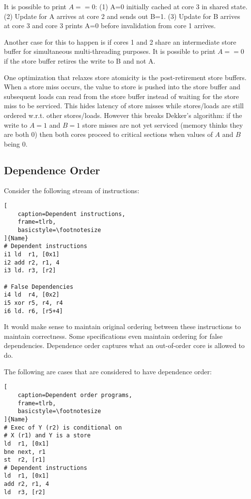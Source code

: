 \documentclass{article}
\begin{document}
\begin{multicols*}{2}
\noindent\newline
It is possible to print $A == 0$: (1) A=0 initially cached at core 3 in shared state. (2) Update for A arrives at core 2 and sends out B=1. (3) Update for B arrives at core 3 and core 3 prints A=0 before invalidation from core 1 arrives.
\medskip\par\noindent
Another case for this to happen is if cores 1 and 2 share an intermediate store buffer for simultaneous multi-threading purposes. It is possible to print $A==0$ if the store buffer retires the write to B and not A.
\medskip\par\noindent
One optimization that relaxes store atomicity is the post-retirement store buffers. When a store miss occurs, the value to store is pushed into the store buffer and subsequent loads can read from the store buffer instead of waiting for the store miss to be serviced. This hides latency of store misses while stores/loads are still ordered w.r.t. other stores/loads. However this breaks Dekker's algorithm: if the write to $A=1$ and $B=1$ store misses are not yet serviced (memory thinks they are both 0) then both cores proceed to critical sections when values of $A$ and $B$ being 0.

\subsection{Dependence Order}
Consider the following stream of instructions:
\begin{lstlisting}[
    caption=Dependent instructions,
    frame=tlrb,
    basicstyle=\footnotesize
]{Name}
# Dependent instructions
i1 ld  r1, [0x1]
i2 add r2, r1, 4
i3 ld. r3, [r2]

# False Dependencies
i4 ld  r4, [0x2]
i5 xor r5, r4, r4
i6 ld. r6, [r5+4]
\end{lstlisting}

\noindent
It would make sense to maintain original ordering between these instructions to maintain correctness. Some specifications even maintain ordering for false dependencies. Dependence order captures what an out-of-order core is allowed to do.

\noindent\newline
The following are cases that are considered to have dependence order:
\begin{lstlisting}[
    caption=Dependent order programs,
    frame=tlrb,
    basicstyle=\footnotesize
]{Name}
# Exec of Y (r2) is conditional on
# X (r1) and Y is a store
ld  r1, [0x1]
bne next, r1
st  r2, [r1]
# Dependent instructions
ld  r1, [0x1]
add r2, r1, 4
ld  r3, [r2]
\end{lstlisting}


\end{multicols*}
\end{document}

